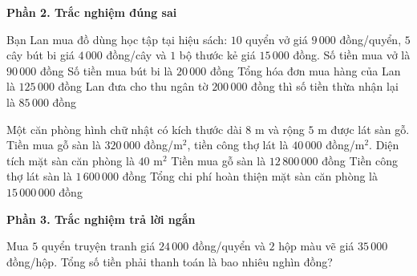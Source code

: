 \textbf{Phần 2. Trắc nghiệm đúng sai}

\begin{ex} %
Bạn Lan mua đồ dùng học tập tại hiệu sách: $10$ quyển vở giá $9\,000$ đồng/quyển, $5$ cây bút bi giá $4\,000$ đồng/cây và $1$ bộ thước kẻ giá $15\,000$ đồng.
\choiceTF
{\True Số tiền mua vở là $90\,000$ đồng}
{\True Số tiền mua bút bi là $20\,000$ đồng}
{\True Tổng hóa đơn mua hàng của Lan là $125\,000$ đồng}
{Lan đưa cho thu ngân tờ $200\,000$ đồng thì số tiền thừa nhận lại là $85\,000$ đồng}
\end{ex}

\begin{ex} %
Một căn phòng hình chữ nhật có kích thước dài $8\text{ m}$ và rộng $5\text{ m}$ được lát sàn gỗ. Tiền mua gỗ sàn là $320\,000$ đồng/$\text{m}^2$, tiền công thợ lát là $40\,000$ đồng/$\text{m}^2$.
\choiceTF
{\True Diện tích mặt sàn căn phòng là $40\text{ m}^2$}
{\True Tiền mua gỗ sàn là $12\,800\,000$ đồng}
{\True Tiền công thợ lát sàn là $1\,600\,000$ đồng}
{Tổng chi phí hoàn thiện mặt sàn căn phòng là $15\,000\,000$ đồng}
\end{ex}

\textbf{Phần 3. Trắc nghiệm trả lời ngắn}

\begin{ex} %
Mua $5$ quyển truyện tranh giá $24\,000$ đồng/quyển và $2$ hộp màu vẽ giá $35\,000$ đồng/hộp. Tổng số tiền phải thanh toán là bao nhiêu nghìn đồng?
\end{ex}

